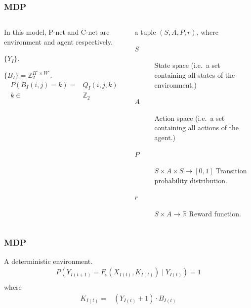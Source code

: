 \documentclass[12pt, aspectratio = 169, xcolor = x11names]{beamer}
\begin{document}
\begin{frame}
  \frametitle{MDP}
  \begin{columns}
    \begin{column}{0.48\textwidth}
      In this model, P-net and C-net are environment and agent respectively.
      \begin{description}[<+->]
        \item[$S$]$\{Y_I\}$.
        \item[$A$]$\{B_I\} = \mathbb{Z}_2^{H^\circ \times W^\circ}$.
          \begin{align*}
            P(B_I(i, j) = k) = & Q_I(i, j, k)\\
            k \in & \mathbb{Z}_2
          \end{align*}
      \end{description}
    \end{column}
    \begin{column}{0.52\textwidth}
      \begin{definition}[MDP]
        a tuple $(S, A, P, r)$, where
      \end{definition}
      \begin{description}
        \item[$S$]State space (i.e.\ a set containing all states of the
          environment.)
        \item[$A$]Action space (i.e.\ a set containing all actions of the
          agent.)
        \item[$P$]$S \times A \times S \rightarrow [0, 1]$ Transition
          probability distribution.
        \item[$r$]$S \times A \rightarrow \mathbb{R}$ Reward function.
      \end{description}
    \end{column}
  \end{columns}
\end{frame}

\begin{frame}
  \frametitle{MDP}
      \begin{description}[<+->]
        \item[$P$]A deterministic environment.
          \begin{align*}
            P(Y_{I(t + 1)} = F_\mathrm{s}(X_{I(t)}, K_{I(t)})\mid Y_{I(t)}) =
            1\\
          \end{align*}
          where
          \begin{align*}
            K_{I(t)} = & (Y_{I(t)} + 1) \cdot B_{I(t)}
          \end{align*}
      \end{description}
\end{frame}
\end{document}
